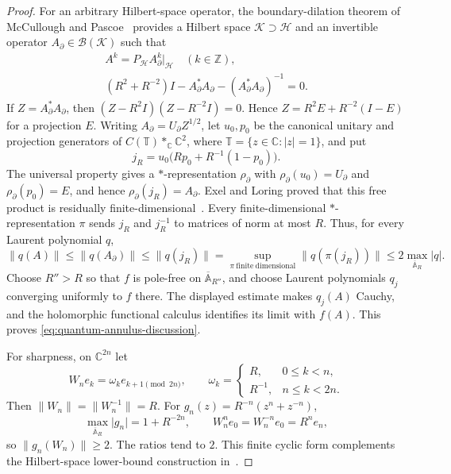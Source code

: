 \documentclass[preprints,article,submit,oneauthor]{Definitions/mdpi}
\theoremstyle{mdpi}
\theoremstyle{definition}
\newcommand{\C}{\mathbb C}
\begin{document}
\begin{proof}
For an arbitrary Hilbert-space operator, the boundary-dilation theorem
of McCullough and Pascoe~\cite{McCulloughPascoe2023} provides a Hilbert
space $\mathcal K\supset\mathcal H$ and an invertible operator
$A_\partial\in\mathcal B(\mathcal K)$ such that
\begin{equation}
\begin{gathered}
 A^k=P_{\mathcal H}A_\partial^k|_{\mathcal H}
 \quad(k\in\mathbb Z),\\
 (R^2+R^{-2})I-A_\partial^*A_\partial
 -(A_\partial^*A_\partial)^{-1}=0.
\end{gathered}
 \label{eq:quantum-boundary-discussion}
\end{equation}
If $Z=A_\partial^*A_\partial$, then
$(Z-R^2I)(Z-R^{-2}I)=0$.  Hence
$Z=R^2E+R^{-2}(I-E)$ for a projection $E$.  Writing
$A_\partial=U_\partial Z^{1/2}$, let $u_0,p_0$ be the canonical unitary
and projection generators of $C(\mathbb T)*_{\C}\C^2$, where
$\mathbb T=\{z\in\C:\lvert z\rvert=1\}$, and put
\[
  j_R=u_0\bigl(Rp_0+R^{-1}(1-p_0)\bigr).
\]
The universal property gives a $*$-representation $\rho_\partial$ with
$\rho_\partial(u_0)=U_\partial$ and $\rho_\partial(p_0)=E$, and hence
$\rho_\partial(j_R)=A_\partial$.
Exel and Loring proved that this free product is residually
finite-dimensional~\cite{ExelLoring1992}.  Every finite-dimensional
$*$-representation $\pi$ sends $j_R$ and $j_R^{-1}$ to matrices of
norm at most $R$.  Thus, for every Laurent polynomial $q$,
\[
 \lVert q(A)\rVert
 \leq\lVert q(A_\partial)\rVert
 \leq\lVert q(j_R)\rVert
 =\sup_{\pi\ \mathrm{finite\ dimensional}}
   \lVert q(\pi(j_R))\rVert
 \leq2\max_{\overline{\mathbb A}_R}\lvert q\rvert.
\]
Choose $R''>R$ so that $f$ is pole-free on
$\overline{\mathbb A}_{R''}$, and choose Laurent polynomials $q_j$
converging uniformly to $f$ there.  The displayed estimate makes
$q_j(A)$ Cauchy, and the holomorphic functional calculus identifies
its limit with $f(A)$.  This proves
\eqref{eq:quantum-annulus-discussion}.

For sharpness, on $\C^{2n}$ let
\[
  W_ne_k=\omega_ke_{k+1\pmod{2n}},
  \qquad
  \omega_k=\begin{cases}
    R,&0\leq k<n,\\ R^{-1},&n\leq k<2n.
  \end{cases}
\]
Then $\lVert W_n\rVert=\lVert W_n^{-1}\rVert=R$.  For
$g_n(z)=R^{-n}(z^n+z^{-n})$,
\[
  \max_{\overline{\mathbb A}_R}\lvert g_n\rvert
  =1+R^{-2n},
  \qquad
  W_n^ne_0=W_n^{-n}e_0=R^ne_n,
\]
so $\lVert g_n(W_n)\rVert\geq2$.  The ratios tend to $2$.
This finite cyclic form complements the Hilbert-space lower-bound
construction in~\cite{Tsikalas2022}.
\end{proof}
\end{document}
